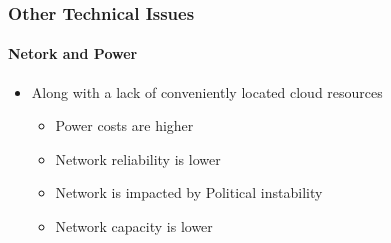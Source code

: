 \begin{frame}
  \frametitle{Other Technical Issues}
  \framesubtitle{Netork and Power}
  \begin{itemize}
    \item<1->Along with a lack of conveniently located cloud resources

          \begin{itemize}
            \item<2-> Power costs are higher
            \item<3-> Network reliability is lower
            \item<4-> Network  is impacted by Political instability
            \item<5-> Network capacity is lower

          \end{itemize}

  \end{itemize}
\end{frame}
